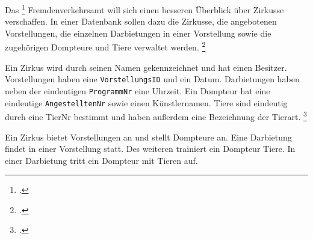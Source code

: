 \documentclass{lehramt-informatik-aufgabe}
\begin{document}

Das
\footcite[Thema 2 Aufgabe 2 Seite 11]{examen:66116:2018:03}
Fremdenverkehrsamt will sich einen besseren Überblick über Zirkusse
verschaffen. In einer Datenbank sollen dazu die Zirkusse, die
angebotenen Vorstellungen, die einzelnen Darbietungen in einer
Vorstellung sowie die zugehörigen Dompteure und Tiere verwaltet werden.
\footcite[Seite 1-2, Aufgabe 1: ER-Diagramm Einstieg]{db:pu:1}

Ein Zirkus wird durch seinen Namen gekennzeichnet und hat einen
Besitzer. Vorstellungen haben eine \texttt{VorstellungsID} und ein
Datum. Darbietungen haben neben der eindeutigen \texttt{ProgrammNr} eine
Uhrzeit. Ein Dompteur hat eine eindeutige \texttt{AngestelltenNr} sowie
einen Künstlernamen. Tiere sind eindeutig durch eine TierNr bestimmt und
haben außerdem eine Bezeichnung der Tierart.
\footcite[Aufgabe 2, I. Das Entity-Relationship Modell, Seite 6]{examen:66114:2008:03}

Ein Zirkus bietet Vorstellungen an und stellt Dompteure an. Eine
Darbietung findet in einer Vorstellung statt. Des weiteren trainiert ein
Dompteur Tiere. In einer Darbietung tritt ein Dompteur mit Tieren auf.
\end{document}
